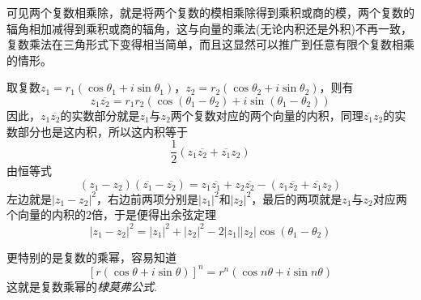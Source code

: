 可见两个复数相乘除，就是将两个复数的模相乘除得到乘积或商的模，两个复数的辐角相加减得到乘积或商的辐角，这与向量的乘法(无论内积还是外积)不再一致，复数乘法在三角形式下变得相当简单，而且这显然可以推广到任意有限个复数相乘的情形。

\begin{example}[利用共轭复数证明余弦定理]
  取复数$z_1=r_1(\cos{\theta_1}+i\sin{\theta_1})$，$z_2=r_2(\cos{\theta_2}+i\sin{\theta_2})$，则有
  \[ z_1\overline{z_2} = r_1r_2(\cos{(\theta_1-\theta_2)+i\sin{(\theta_1-\theta_2)}}) \]
  因此，$z_1\overline{z_2}$的实数部分就是$z_1$与$z_2$两个复数对应的两个向量的内积，同理$\overline{z_1}z_2$的实数部分也是这内积，所以这内积等于
  \[ \frac{1}{2}(z_1\overline{z_2}+\overline{z_1}z_2) \]
  由恒等式
  \[ (z_1-z_2)(\overline{z_1}-\overline{z_2})= z_1\overline{z_1} + z_2\overline{z_2} -(z_1\overline{z_2}+\overline{z_1}z_2) \]
  左边就是$|z_1-z_2|^2$，右边前两项分别是$|z_1|^2$和$|z_2|^2$，最后的两项就是$z_1$与$z_2$对应两个向量的内积的2倍，于是便得出余弦定理
  \[ |z_1-z_2|^2 = |z_1|^2+|z_2|^2-2|z_1||z_2|\cos{(\theta_1-\theta_2)} \]
\end{example}

更特别的是复数的乘幂，容易知道
\begin{equation}
  \label{eq:de-moivre-formula}
  [r(\cos{\theta}+i\sin{\theta})]^n = r^n(\cos{n\theta}+i\sin{n\theta})
\end{equation}
这就是复数乘幂的\emph{棣莫弗公式}.

